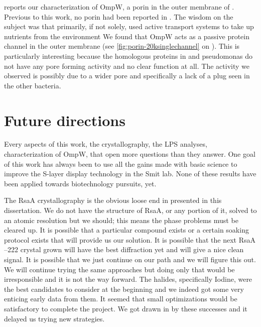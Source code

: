  reports our characterization of OmpW, a porin in the outer membrane of \caulobacter{}. Previous to this work, no porin had been reported in \caulobacter{}. The wisdom on the subject was that \caulobacter{} primarily, if not solely, used active transport systems to take up nutrients from the environment We found that OmpW acts as a passive protein channel in the outer membrane (see \cref{fig:porin-20ksinglechannel} on ). This is particularly interesting because the homologous proteins in \ecoli{} and \ac{pseudomonas} do not have any pore forming activity and no clear function at all.  The activity we observed is possibly due to a wider pore and specifically a lack of a plug seen in the other bacteria.  

\section{Future directions}\label{sec:future-directions}

Every aspects of this work, the crystallography, the \ac{LPS} analyses, characterization of OmpW, that open more questions than they answer. One goal of this work has always been to use all the gains made with basic science to improve the \caulobacter{} \ac{S-layer} display technology in the Smit lab. None of these results have been applied towards biotechnology pursuits, yet.

The RsaA crystallography is the obvious loose end in presented in this dissertation. We do not have the structure of RsaA, or any portion of it, solved to an atomic resolution but we should; this means the phase problems must be cleared up. It is possible that a particular compound exists or a certain soaking protocol exists that will provide us our solution. It is possible that the next RsaA --222 crystal grown will have the best diffraction yet and will give a nice clean signal. It is possible that we just continue on our path and we will figure this out. We will continue trying the same approaches but doing only that would be irresponsible and it is not the way forward. The halides, specifically Iodine, were the best candidates to consider at the beginning and we indeed got some very enticing early data from them. It seemed that small optimizations would be satisfactory to complete the project. We got drawn in by these successes and it delayed us trying new strategies.

